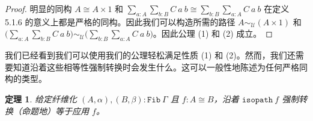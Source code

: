 \documentclass{ctexrep}
\theoremstyle{plain}
\newtheorem{theorem}{定理}[section]
\theoremstyle{definition}
\theoremstyle{remark}
\begin{document}
\begin{proof}
明显的同构 $A \cong A \times 1$ 和 $\sum_{a:A} \sum_{b:B} C\ a\ b \cong \sum_{b:B} \sum_{a:A} C\ a\ b$ 在定义 5.1.6 的意义上都是严格的同构。因此我们可以构造所需的路径 $A \sim_{\mathcal{U}} (A \times 1)$ 和 $\big(\sum_{a:A} \sum_{b:B} C\ a\ b\big) \sim_{\mathcal{U}} \big(\sum_{b:B} \sum_{a:A} C\ a\ b\big)$。因此公理 (1) 和 (2) 成立。
\end{proof}

我们已经看到我们可以使用我们的公理轻松满足性质 (1) 和 (2)。然而，我们还需要知道沿着这些相等性强制转换时会发生什么。这可以一般性地陈述为任何严格同构的类型。

\begin{theorem}
给定纤维化 $(A,\alpha), (B,\beta) : \mathtt{Fib}\ \Gamma$ 且 $f : A \cong B$，沿着 $\mathtt{isopath}\ f$ 强制转换（命题地）等于应用 $f$。
\end{theorem}
\end{document}
